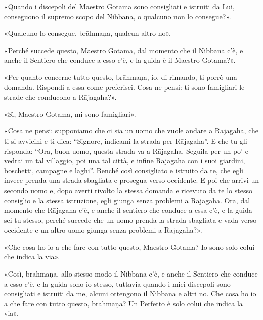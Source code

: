 
«Quando i discepoli del Maestro Gotama sono consigliati e istruiti da Lui,
conseguono il supremo scopo del Nibbāna, o qualcuno non lo consegue?».

«Qualcuno lo consegue, brāhmaṇa, qualcun altro no».

«Perché succede questo, Maestro Gotama, dal momento che il Nibbāna c’è, e anche
il Sentiero che conduce a esso c’è, e la guida è il Maestro Gotama?».

«Per quanto concerne tutto questo, brāhmaṇa, io, di rimando, ti porrò una
domanda. Rispondi a essa come preferisci. Cosa ne pensi: ti sono famigliari le
strade che conducono a Rājagaha?».

«Sì, Maestro Gotama, mi sono famigliari».

«Cosa ne pensi: supponiamo che ci sia un uomo che vuole andare a Rājagaha, che
ti si avvicini e ti dica: “Signore, indicami la strada per Rājagaha”. E che tu
gli risponda: “Ora, buon uomo, questa strada va a Rājagaha. Seguila per un po’ e
vedrai un tal villaggio, poi una tal città, e infine Rājagaha con i suoi
giardini, boschetti, campagne e laghi”. Benché così consigliato e istruito da
te, che egli invece prenda una strada sbagliata e prosegua verso occidente. E
poi che arrivi un secondo uomo e, dopo averti rivolto la stessa domanda e
ricevuto da te lo stesso consiglio e la stessa istruzione, egli giunga senza
problemi a Rājagaha. Ora, dal momento che Rājagaha c’è, e anche il sentiero che
conduce a essa c’è, e la guida sei tu stesso, perché succede che un uomo prenda
la strada sbagliata e vada verso occidente e un altro uomo giunga senza problemi
a Rājagaha?».

«Che cosa ho io a che fare con tutto questo, Maestro Gotama? Io sono solo colui
che indica la via».

«Così, brāhmaṇa, allo stesso modo il Nibbāna c’è, e anche il Sentiero che
conduce a esso c’è, e la guida sono io stesso, tuttavia quando i miei discepoli
sono consigliati e istruiti da me, alcuni ottengono il Nibbāna e altri no. Che
cosa ho io a che fare con tutto questo, brāhmaṇa? Un Perfetto è solo colui che
indica la via».


